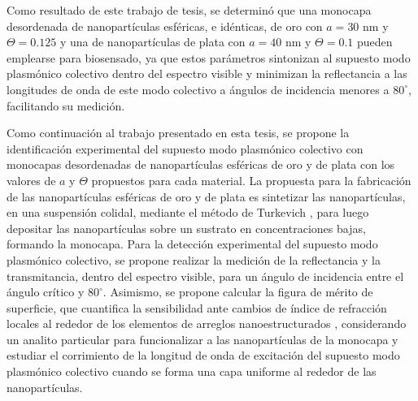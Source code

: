  Como resultado de este trabajo de tesis, se determinó que una monocapa desordenada de nanopartículas esféricas, e idénticas, de oro con $a=30$ nm y  $\Theta=0.125$ y una de nanopartículas de plata con $a=40$ nm y $\Theta=0.1$ pueden emplearse para biosensado, ya que estos parámetros sintonizan al supuesto modo plasmónico colectivo dentro del espectro visible y minimizan la reflectancia a las longitudes de onda de este modo colectivo a ángulos de incidencia menores a $80^\circ$, facilitando su medición. 
 
Como continuación al trabajo presentado en esta tesis, se propone la identificación experimental del supuesto modo plasmónico colectivo con monocapas desordenadas de nanopartículas esféricas de oro y de plata con los valores de $a$ y $\Theta$ propuestos para cada material. La propuesta para la fabricación de las nanopartículas esféricas de oro y de plata es sintetizar las nanopartículas, en una suspensión colidal, mediante el método de Turkevich \cite{wuithschick2015turkevich}, para luego depositar las nanopartículas sobre un sustrato en concentraciones bajas, formando la monocapa. Para la detección experimental del supuesto modo plasmónico colectivo, se propone realizar la medición de la reflectancia y la transmitancia, dentro del espectro visible,  para un ángulo de incidencia entre el ángulo crítico y $80^\circ$. Asimismo, se propone calcular la figura de mérito de superficie, que cuantifica la sensibilidad ante cambios de índice de refracción locales al rededor de los elementos de arreglos nanoestructurados \cite{estevez2014trends,svedendahl2009refractometric}, considerando un analito particular para funcionalizar a las nanopartículas de la monocapa y estudiar el corrimiento de la longitud de onda de excitación del supuesto modo plasmónico colectivo cuando se forma una capa uniforme al rededor de las nanopartículas.


















